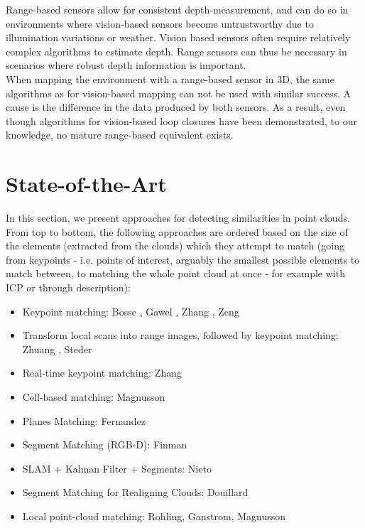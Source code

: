 Range-based sensors allow for consistent depth-measurement, and can do so in environments where vision-based sensors become untrustworthy due to illumination variations or weather. Vision based sensors often require relatively complex algorithms to estimate depth. Range sensors can thus be necessary in scenarios where robust depth information is important.\\

When mapping the environment with a range-based sensor in 3D, the same algorithms as for vision-based mapping can not be used with similar success. A cause is the difference in the data produced by both sensors. As a result, even though algorithms for vision-based loop closures have been demonstrated, to our knowledge, no mature range-based equivalent exists.\\

\section{State-of-the-Art}
\label{sec:SOTA}

In this section, we present approaches for detecting similarities in point clouds. From top to bottom, the following approaches are ordered based on the size of the elements (extracted from the clouds) which they attempt to match (going from keypoints - i.e. points of interest, arguably the smallest possible elements to match between, to matching the whole point cloud at once - for example with ICP or through description):

\begin{itemize}
  \item{Keypoint matching: Bosse \cite{bosse2013place}, Gawel \cite{Gawel2016}, Zhang \cite{zhang2014loam}, Zeng \cite{zeng20163dmatch}}
\item{Transform local scans into range images, followed by keypoint matching: Zhuang \cite{zhuang20133},  Steder \cite{steder2010robust, steder2011place}}
  \item{Real-time keypoint matching: Zhang \citet{zhang2014loam}}
  \item{Cell-based matching: Magnusson \cite{magnusson2009automatic}}
  \item{Planes Matching: Fernandez \cite{fernandez2013fast, fernandez2016scene}}
  \item{Segment Matching (RGB-D): Finman \cite{finman2015icraws}}
  \item{SLAM + Kalman Filter + Segments: Nieto \cite{nieto2006scan}}
  \item{Segment Matching for Realigning Clouds: Douillard \cite{douillard2012scan, douillard2014pipeline}}
  \item{Local point-cloud matching: Rohling, Ganstrom, Magnusson \cite{rohling2015fast, granstrom2011learning,magnusson2009automatic}}
\end{itemize}

